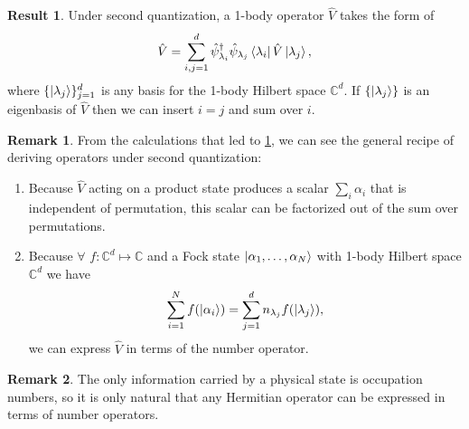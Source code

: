 \documentclass{article}
\theoremstyle{definition}
\newtheorem{res}{Result}[section]
\newtheorem{rem}{Remark}[section]
\theoremstyle{plain}
\numberwithin{equation}{section}
\begin{document}
\begin{graybox}
\begin{res}
    \label{res:1-body-operators}
    Under second quantization, 
    a 1-body operator $\hat{V}$ 
    takes the form of
    \begin{equation}
        \hat{V}
        =
        \sum_{i,j=1}^{d}
        \hat{\psi}_{\lambda_{i}}^{\dagger}
        \hat{\psi}_{\lambda_{j}}
        \bra{\lambda_{i}} \hat{V} 
        \ket{\lambda_{j}},
    \label{eqn:1-body-operator-under-second-quantization}
    \end{equation}
    where $\{\ket{\lambda_{j}}\}_{j=1}^{d}$ 
    is any basis
    for the 1-body Hilbert space $\mathbb{C}^{d}$. 
    If $\left\{ \ket{\lambda_{j}} \right\}$ 
    is an eigenbasis of $\hat{V}$ then 
    we can insert $i = j$ and sum over $i$.
\end{res}
\end{graybox}

\begin{rem}
    \label{rem:recipe-for-calculating-2nd-quantized-operators}
    From the calculations that led to 
    \cref{res:1-body-operators}, 
    we can see the general recipe of 
    deriving operators under second quantization: 
    \begin{enumerate}
        \item 
        Because $\hat{V}$ acting on 
        a product state produces 
        a scalar
        $\sum_{i}\alpha_{i}$
        that is 
        independent of permutation, 
        this scalar can be factorized 
        out of the sum over permutations.
        \item
        Because 
        $\forall$ 
        $f: \mathbb{C}^{d} \mapsto \mathbb{C}$ 
        and a Fock state 
        $\ket{\alpha_1, \ldots ,\alpha_{N}}$ 
        with 1-body Hilbert space $\mathbb{C}^{d}$
        we have 
        \[
            \sum_{i = 1}^{N}
        f(\ket{\alpha_{i}})
        =
        \sum_{j=1}^{d}
        n_{\lambda_{j}}f(\ket{\lambda_{j}}),
        \]
        we can express $\hat{V}$ 
        in terms of the number operator.
    \end{enumerate}
\end{rem}

\begin{rem}
    The only information carried by a 
    physical state is occupation numbers, 
    so it is only natural that 
    any Hermitian operator can be 
    expressed in terms of 
    number operators. 
\end{rem}
\end{document}
